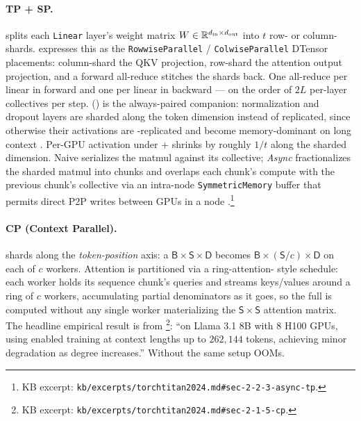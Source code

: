 \paragraph{TP + SP.}  \citep[\S 2.1.3]{torchtitan2024}
splits each \texttt{Linear} layer's weight matrix $W \in \mathbb{R}^{d_{\text{in}}
\times d_{\text{out}}}$ into $t$ row- or column-shards. 
expresses this as the \texttt{RowwiseParallel} / \texttt{ColwiseParallel}
DTensor placements: column-shard the QKV projection, row-shard the
attention output projection, and a forward all-reduce stitches the
shards back. One all-reduce per linear in forward and one per linear
in backward --- on the order of $2L$ per-layer collectives per step.
 () is the always-paired companion: normalization
and dropout layers are sharded along the token dimension instead of
replicated, since otherwise their activations are -replicated and
become memory-dominant on long context \citep[\S 2.1.3]{torchtitan2024}.
Per-GPU activation under + shrinks by roughly $1/t$ along the
sharded dimension. Naive  serializes the matmul against its
collective; \emph{Async } fractionalizes the sharded matmul into
chunks and overlaps each chunk's compute with the previous chunk's
collective via an intra-node \texttt{SymmetricMemory} buffer that
permits direct P2P writes between GPUs in a node \citep[\S
2.2.3]{torchtitan2024}.\footnote{KB excerpt:
\texttt{kb/excerpts/torchtitan2024.md\#sec-2-2-3-async-tp}.}

\paragraph{CP (Context Parallel).}  shards along the
\emph{token-position} axis: a $\mathsf{B}\!\times\!\mathsf{S}\!\times\!\mathsf{D}$
 becomes $\mathsf{B}\!\times\!(\mathsf{S}/c)\!\times\!\mathsf{D}$
on each of $c$ workers. Attention is partitioned via a ring-attention-
style schedule: each worker holds its sequence chunk's queries and
streams keys/values around a ring of $c$ workers, accumulating partial
 denominators as it goes, so the full  is computed
without any single worker materializing the $\mathsf{S}\!\times\!\mathsf{S}$
attention matrix. The headline empirical result is from
\citet[\S 2.1.5]{torchtitan2024}\footnote{KB excerpt:
\texttt{kb/excerpts/torchtitan2024.md\#sec-2-1-5-cp}.}: ``on Llama 3.1
8B with 8 H100 GPUs, using  enabled training at context lengths up
to $262{,}144$ tokens, achieving minor  degradation as  degree
increases.'' Without  the same setup OOMs.

